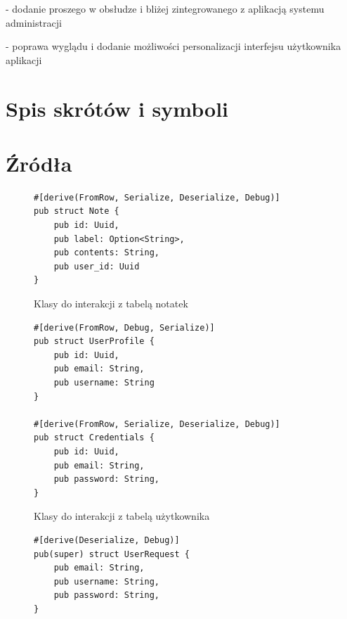 \documentclass[a4paper,twoside,12pt]{book}
\begin{document}
- dodanie proszego w obsłudze i bliżej zintegrowanego z aplikacją systemu administracji

- poprawa wyglądu i dodanie możliwości personalizacji interfejsu użytkownika aplikacji


\backmatter


\begin{appendices}

\chapter{Spis skrótów i symboli}



\chapter{Źródła}

\begin{figure}[H]
\centering
\begin{lstlisting}
#[derive(FromRow, Serialize, Deserialize, Debug)]
pub struct Note {
    pub id: Uuid,
    pub label: Option<String>,
    pub contents: String,
    pub user_id: Uuid
}
\end{lstlisting}
\caption{Klasy do interakcji z tabelą notatek}
\label{fig:pseudokod:klasa-note}
\end{figure}

\begin{figure}[H]
\centering
\begin{lstlisting}
#[derive(FromRow, Debug, Serialize)]
pub struct UserProfile {
    pub id: Uuid,
    pub email: String,
    pub username: String
}

#[derive(FromRow, Serialize, Deserialize, Debug)]
pub struct Credentials {
    pub id: Uuid,
    pub email: String,
    pub password: String,
}
\end{lstlisting}
\caption{Klasy do interakcji z tabelą użytkownika}
\label{fig:pseudokod:klasa-user}
\end{figure}

\begin{figure}[H]
\centering
\begin{lstlisting}
#[derive(Deserialize, Debug)]
pub(super) struct UserRequest {
    pub email: String,
    pub username: String,
    pub password: String,
}


\end{lstlisting}
\end{figure}
\end{appendices}
\end{document}
